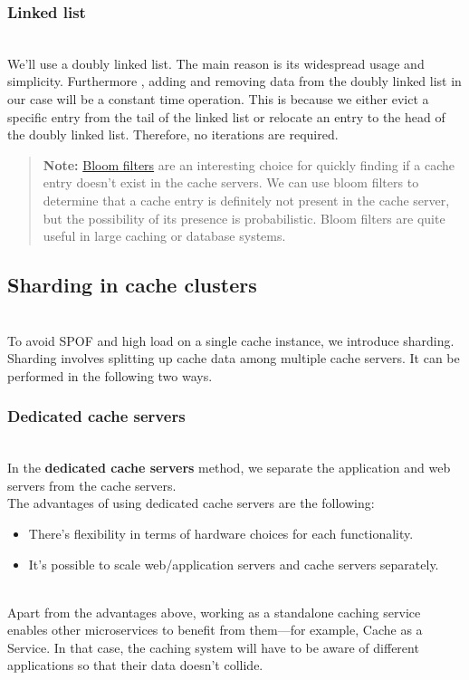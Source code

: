 \subsubsection{Linked list}\label{Kc82fdY1KXVrA27xF30V8}
\\
We'll use a doubly linked list. The main reason is its widespread usage and simplicity. Furthermore , adding and removing data from the doubly linked list in our case will be a constant time operation. This is because we either evict a specific entry from the tail of the linked list or relocate an entry to the head of the doubly linked list. Therefore, no iterations are required.
\begin{quote}
\textbf{Note:} \href{https://www.educative.io/answers/what-is-a-bloom-filter}{Bloom filters} are an interesting choice for quickly finding if a cache entry doesn't exist in the cache servers. We can use bloom filters to determine that a cache entry is definitely not present in the cache server, but the possibility of its presence is probabilistic. Bloom filters are quite useful in large caching or database systems.
\end{quote}
\subsection{Sharding in cache clusters}\label{Q98c5DXwz9jazDvkvPVLg}
\\
To avoid SPOF and high load on a single cache instance, we introduce sharding. Sharding involves splitting up cache data among multiple cache servers. It can be performed in the following two ways.

\subsubsection{Dedicated cache servers}\label{PXXoauu5aDWmi_DSg9OFM}
\\
In the \textbf{dedicated cache servers} method, we separate the application and web servers from the cache servers.
\\
The advantages of using dedicated cache servers are the following:

\begin{itemize}
\item
\protect{}\label{HPEsTVsfn9tAWaEwjNnCq}
There's flexibility in terms of hardware choices for each functionality.
\item
\protect{}\label{WWHzNYce_ped_vpyQRdB9}
It's possible to scale web/application servers and cache servers separately.
\end{itemize}
\\
Apart from the advantages above, working as a standalone caching service enables other microservices to benefit from them---for example, Cache as a Service. In that case, the caching system will have to be aware of different applications so that their data doesn't collide.

